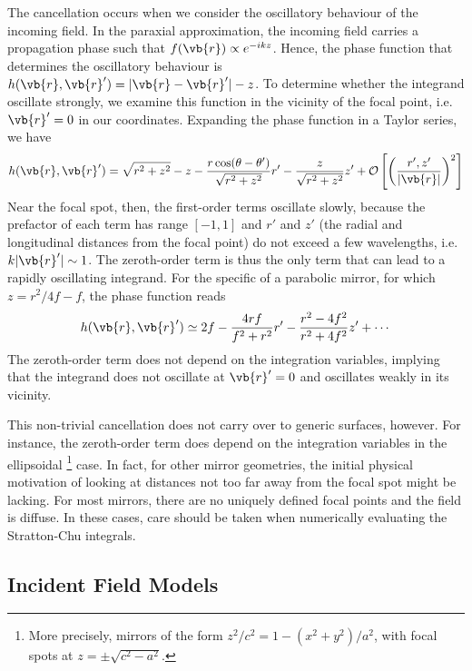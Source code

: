 \documentclass[11pt,SymmetricalJury]{inrsthesis/inrsthesis}
\begin{document}
The cancellation occurs when we consider the oscillatory behaviour of the
incoming field. In the paraxial approximation, the incoming field carries
a propagation phase such that $f(\vb{r})\propto e^{-ikz}$. Hence, the phase
function that determines the oscillatory behaviour is
$h(\vb{r},\vb{r}')=|\vb{r}-\vb{r}'|-z$. To determine whether the integrand
oscillate strongly, we examine this function in the vicinity of the focal
point, i.e. $\vb{r}'=0$ in our coordinates.
Expanding the phase function in a Taylor series, we have
  \begin{equation}
    h(\vb{r},\vb{r}') = \sqrt{r^2+z^2}-z
                  -\frac{r\cos(\theta-\theta')}{\sqrt{r^2+z^2}} r'
                  -\frac{z}{\sqrt{r^2+z^2}}z'
                  + \mathcal{O}\left[\left(\frac{r',z'}{|\vb{r}|}\right)^2\right]
  \end{equation}
Near the focal spot, then, the first-order terms oscillate slowly, because the prefactor
of each term has range $[-1,1]$ and $r'$ and $z'$
(the radial and longitudinal distances from the focal point)
do not exceed a few wavelengths, i.e. $k|\vb{r}'|\sim1$.
The zeroth-order term
is thus the only term that can lead to a rapidly oscillating
integrand.
For the specific of a parabolic mirror, for which $z=r^2/4f-f$, the phase function
reads
  \begin{equation}
    h(\vb{r},\vb{r}')\simeq 2f - \frac{4rf}{f^2+r^2} r' - \frac{r^2-4f^2}{r^2+4f^2} z' + \cdots
  \end{equation}
The zeroth-order term does not depend on the integration variables, implying
that the integrand does not oscillate at $\vb{r}'=0$ and oscillates weakly
in its vicinity.

This non-trivial cancellation does not carry over to generic surfaces, however.
For instance, the zeroth-order term does depend on the integration variables
in the ellipsoidal \footnote{More precisely,
mirrors of the form $z^2/c^2=1-(x^2+y^2)/a^2$, with focal spots
at $z=\pm\sqrt{c^2-a^2}$.} case. In fact, for other mirror geometries, the initial
physical motivation of looking at distances not too far away from the focal spot
might be lacking. For most mirrors, there are no uniquely
defined focal points and the field is diffuse. In these cases, care
should be taken when numerically evaluating the Stratton-Chu integrals.

\subsection{Incident Field Models}
\end{document}
